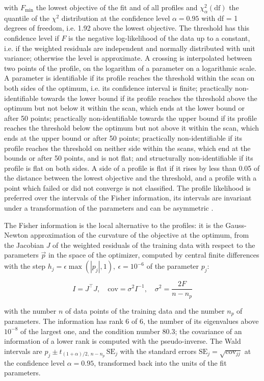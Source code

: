 with $F_{\min}$ the lowest objective of the fit and of all profiles and $\chi^2_{\alpha}(\mathrm{df})$ the quantile of the $\chi^2$ distribution at the confidence level $\alpha = 0.95$ with df = 1 degrees of freedom, i.e. 1.92 above the lowest objective. The threshold has this confidence level if $F$ is the negative log-likelihood of the data up to a constant, i.e. if the weighted residuals are independent and normally distributed with unit variance; otherwise the level is approximate. A crossing is interpolated between two points of the profile, on the logarithm of a parameter on a logarithmic scale. A parameter is identifiable if its profile reaches the threshold within the scan on both sides of the optimum, i.e. its confidence interval is finite; practically non-identifiable towards the lower bound if its profile reaches the threshold above the optimum but not below it within the scan, which ends at the lower bound or after 50 points; practically non-identifiable towards the upper bound if its profile reaches the threshold below the optimum but not above it within the scan, which ends at the upper bound or after 50 points; practically non-identifiable if its profile reaches the threshold on neither side within the scans, which end at the bounds or after 50 points, and is not flat; and structurally non-identifiable if its profile is flat on both sides. A side of a profile is flat if it rises by less than 0.05 of the distance between the lowest objective and the threshold, and a profile with a point which failed or did not converge is not classified. The profile likelihood is preferred over the intervals of the Fisher information, its intervals are invariant under a transformation of the parameters and can be asymmetric \cite{Wieland2021}.

The Fisher information is the local alternative to the profiles: it is the Gauss-Newton approximation of the curvature of the objective at the optimum, from the Jacobian $J$ of the weighted residuals of the training data with respect to the parameters $\vec{p}$ in the space of the optimizer, computed by central finite differences with the step $h_j = \epsilon \max(|p_j|, 1),\ \epsilon = 10^{-6}$ of the parameter $p_j$:

\begin{equation}
I = J^\top J, \quad \mathrm{cov} = \sigma^2 I^{-1}, \quad \sigma^2 = \frac{2 F}{n - n_p}
\end{equation}

with the number $n$ of data points of the training data and the number $n_p$ of parameters. The information has rank 6 of 6, the number of its eigenvalues above $10^{-8}$ of the largest one, and the condition number 80.3; the covariance of an information of a lower rank is computed with the pseudo-inverse. The Wald intervals are $\hat{p}_j \pm t_{(1+\alpha)/2,\, n-n_p}\, \mathrm{SE}_j$ with the standard errors $\mathrm{SE}_j = \sqrt{\mathrm{cov}_{jj}}$ at the confidence level $\alpha = 0.95$, transformed back into the units of the fit parameters.


